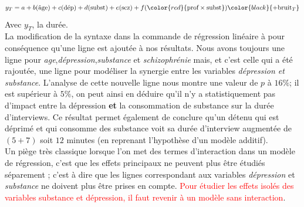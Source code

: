 $$ y_{T} = a + b(\textrm{âge}) + c(\textrm{dép}) + d(\textrm{subst})  + e(\textrm{scz}) + f(\color{red}{\textrm{prof} \times \textrm{subst}}) \color{black}{+ \textrm{bruit}_{T}}$$ 
Avec $y_{T}$, la durée.\newline
\\
La modification de la syntaxe dans la commande de régression linéaire à pour conséquence qu'une ligne est ajoutée à nos résultats. Nous avons toujours une ligne pour \textit{age},\textit{dépression},\textit{substance} et \textit{schizophrénie} mais, et c'est celle qui a été rajoutée, une ligne pour modéliser la synergie entre les variables \textit{dépression et substance}.\newline
L'analyse de cette nouvelle ligne nous montre une valeur de $p$ à $16\%$; il est supérieur à $5\%$, on peut ainsi en déduire qu'il n'y a statistiquement pas d'impact entre la dépression \textbf{et} la consommation de substance sur la durée d'interviews. Ce résultat permet également de conclure qu'un détenu qui est déprimé et qui consomme des substance voit sa durée d'interview augmentée de $(5+7)$ soit $12$ minutes (en reprenant l'hypothèse d'un modèle additif).\newline
\\ 
Un piège très classique lorsque l'on met des termes d'interaction dans un modèle de régression, c'est que les effets principaux ne peuvent plus être étudiés séparement ; c'est à dire que les lignes correspondant aux variables \textit{dépression} et \textit{substance} ne doivent plus être prises en compte.\newline
\textcolor{red}{Pour étudier les effets isolés des variables substance et dépression, il faut revenir à un modèle sans interaction}.

\newpage

